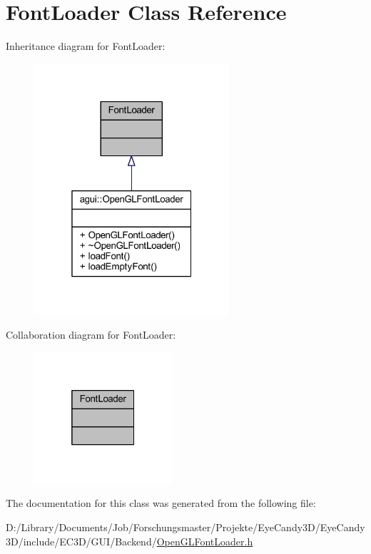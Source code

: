 \hypertarget{class_font_loader}{}\section{Font\+Loader Class Reference}
\label{class_font_loader}


Inheritance diagram for Font\+Loader\+:
\nopagebreak
\begin{figure}[H]
\begin{center}
\leavevmode
\includegraphics[width=205pt]{class_font_loader__inherit__graph}
\end{center}
\end{figure}


Collaboration diagram for Font\+Loader\+:
\nopagebreak
\begin{figure}[H]
\begin{center}
\leavevmode
\includegraphics[width=145pt]{class_font_loader__coll__graph}
\end{center}
\end{figure}


The documentation for this class was generated from the following file\+:\begin{DoxyCompactItemize}
\item 
D\+:/\+Library/\+Documents/\+Job/\+Forschungsmaster/\+Projekte/\+Eye\+Candy3\+D/\+Eye\+Candy3\+D/include/\+E\+C3\+D/\+G\+U\+I/\+Backend/\mbox{\hyperlink{_open_g_l_font_loader_8h}{Open\+G\+L\+Font\+Loader.\+h}}\end{DoxyCompactItemize}
